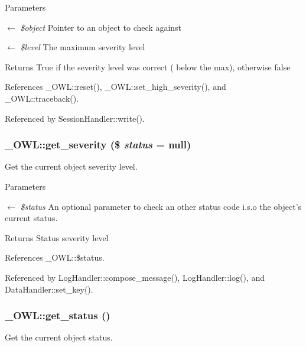 \begin{DoxyParams}{Parameters}
\item[\mbox{$\leftarrow$} {\em \$object}]Pointer to an object to check against \item[\mbox{$\leftarrow$} {\em \$level}]The maximum severity level \end{DoxyParams}
\begin{DoxyReturn}{Returns}
True if the severity level was correct ( below the max), otherwise false 
\end{DoxyReturn}


References \_\-OWL::reset(), \_\-OWL::set\_\-high\_\-severity(), and \_\-OWL::traceback().



Referenced by SessionHandler::write().

\subsubsection[{get\_\-severity}]{\setlength{\rightskip}{0pt plus 5cm}\_\-OWL::get\_\-severity (\$ {\em status} = {\ttfamily null})}\label{class__OWL_adf9509ef96858be7bdd9414c5ef129aa}
Get the current object severity level.


\begin{DoxyParams}{Parameters}
\item[\mbox{$\leftarrow$} {\em \$status}]An optional parameter to check an other status code i.s.o the object's current status. \end{DoxyParams}
\begin{DoxyReturn}{Returns}
Status severity level 
\end{DoxyReturn}


References \_\-OWL::\$status.



Referenced by LogHandler::compose\_\-message(), LogHandler::log(), and DataHandler::set\_\-key().

\subsubsection[{get\_\-status}]{\setlength{\rightskip}{0pt plus 5cm}\_\-OWL::get\_\-status ()}\label{class__OWL_a99ec771fa2c5c279f80152cc09e489a8}
Get the current object status.

